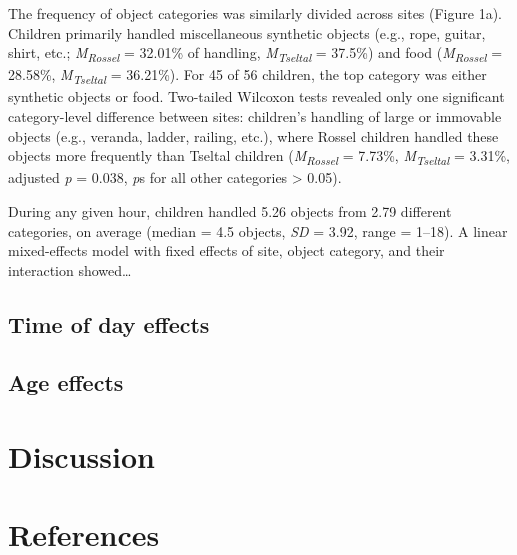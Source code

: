 \documentclass[10pt, letterpaper]{article}
\begin{document}
The frequency of object categories was similarly divided across sites
(Figure 1a). Children primarily handled miscellaneous synthetic objects
(e.g., rope, guitar, shirt, etc.; \emph{M}\textsubscript{\emph{Rossel}}
= 32.01\% of handling, \emph{M}\textsubscript{\emph{Tseltal}} = 37.5\%)
and food (\emph{M}\textsubscript{\emph{Rossel}} = 28.58\%,
\emph{M}\textsubscript{\emph{Tseltal}} = 36.21\%). For 45 of 56
children, the top category was either synthetic objects or food.
Two-tailed Wilcoxon tests revealed only one significant category-level
difference between sites: children's handling of large or immovable
objects (e.g., veranda, ladder, railing, etc.), where Rossel children
handled these objects more frequently than Tseltal children
(\emph{M}\textsubscript{\emph{Rossel}} = 7.73\%,
\emph{M}\textsubscript{\emph{Tseltal}} = 3.31\%, adjusted \emph{p} =
0.038, \emph{p}s for all other categories \textgreater{} 0.05).

During any given hour, children handled 5.26 objects from 2.79 different
categories, on average (median = 4.5 objects, \emph{SD} = 3.92, range =
1--18). A linear mixed-effects model with fixed effects of site, object
category, and their interaction showed\ldots{}

\hypertarget{time-of-day-effects}{%
\subsection{Time of day effects}\label{time-of-day-effects}}

\hypertarget{age-effects}{%
\subsection{Age effects}\label{age-effects}}

\hypertarget{discussion}{%
\section{Discussion}\label{discussion}}

\hypertarget{references}{%
\section{References}\label{references}}

\setlength{\parindent}{-0.1in} 
\setlength{\leftskip}{0.125in}

\noindent


\end{document}
